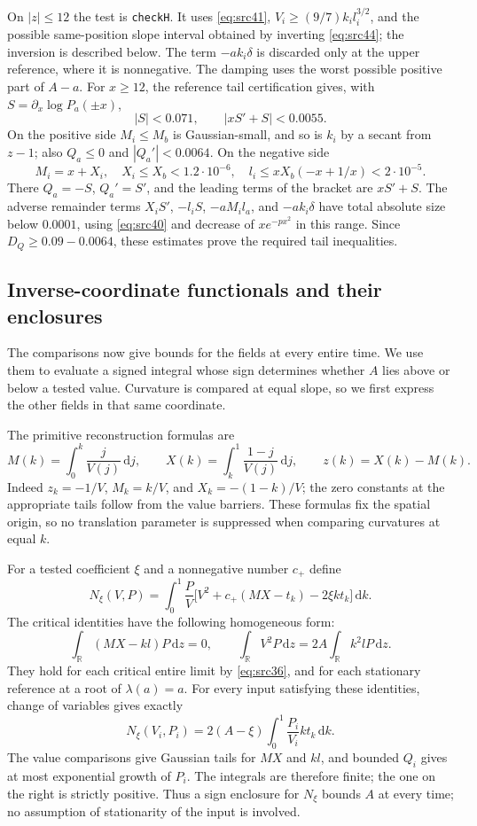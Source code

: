 \documentclass[11pt,a4paper]{article}
\numberwithin{equation}{section}
\theoremstyle{definition}
\theoremstyle{remark}
\newcommand{\R}{\mathbb R}
\newcommand{\dd}{\mathrm d}
\begin{document}
On $|z|\le12$ the test is \texttt{checkH}.  It uses
\eqref{eq:src41}, $V_i\ge(9/7)k_il_i^{3/2}$, and the possible
same-position slope interval obtained by inverting
\eqref{eq:src44}; the inversion is described below.  The term
$-ak_i\delta$ is discarded only at the upper reference, where it is
nonnegative.  The damping uses the worst possible positive part of
$A-a$.
For $x\ge12$, the reference tail certification gives, with
$S=\partial_x\log P_a(\pm x)$,
\[
 |S|<0.071,\qquad |xS'+S|<0.0055.
\]
On the positive side $M_i\le M_b$ is Gaussian-small, and so is $k_i$
by a secant from $z-1$; also $Q_a\le0$ and $|Q_a'|<0.0064$.
On the negative side
\[
 M_i=x+X_i,\quad X_i\le X_b<1.2\cdot10^{-6},\quad
 l_i\le xX_b(-x+1/x)<2\cdot10^{-5}.
\]
There $Q_a=-S$, $Q_a'=S'$, and the leading terms of the bracket are
$xS'+S$.  The adverse remainder terms
$X_iS'$, $-l_iS$, $-aM_il_a$, and $-ak_i\delta$ have total absolute
size below $0.0001$, using \eqref{eq:src40} and decrease of
$xe^{-px^2}$ in this range.  Since $D_Q\ge0.09-0.0064$, these
estimates prove the required tail inequalities.

\subsection{Inverse-coordinate functionals and their enclosures}
\label{subsec:contr-functional}

The comparisons now give bounds for the fields at every entire time.
We use them to evaluate a signed integral whose sign determines whether
$A$ lies above or below a tested value.  Curvature is compared at equal
slope, so we first express the other fields in that same coordinate.

The primitive reconstruction formulas are
\begin{equation}
 M(k)=\int_0^k\frac{j}{V(j)}\,\dd j,\qquad
 X(k)=\int_k^1\frac{1-j}{V(j)}\,\dd j,\qquad z(k)=X(k)-M(k).
 \label{eq:src50}
\end{equation}
Indeed $z_k=-1/V$, $M_k=k/V$, and $X_k=-(1-k)/V$; the zero
constants at the appropriate tails follow from the value barriers.
These formulas fix the spatial origin, so no translation parameter
is suppressed when comparing curvatures at equal $k$.

For a tested coefficient $\xi$ and a nonnegative number $c_+$ define
\[
 N_\xi(V,P)=\int_0^1\frac{P}{V}
       \bigl[V^2+c_+(MX-t_k)-2\xi kt_k\bigr]\,\dd k.
\]
The critical identities have the following homogeneous form:
\begin{equation}\label{eq:contr-homogeneous}
 \int_{\R}(MX-kl)P\,\dd z=0,\qquad
 \int_{\R}V^2P\,\dd z=2A\int_{\R}k^2lP\,\dd z.
\end{equation}
They hold for each critical entire limit by \eqref{eq:src36}, and for
each stationary reference at a root of $\lambda(a)=a$.  For every
input satisfying these identities, change of variables gives exactly
\[
 N_\xi(V_i,P_i)
   =2(A-\xi)\int_0^1\frac{P_i}{V_i}kt_k\,\dd k.
\]
The value comparisons give Gaussian tails for $MX$ and $kl$, and
bounded $Q_i$ gives at most exponential growth of $P_i$.  The integrals
are therefore finite; the one on the right is strictly positive.
Thus a sign enclosure for
$N_\xi$ bounds $A$ at every time; no assumption of stationarity of
the input is involved.
\end{document}
